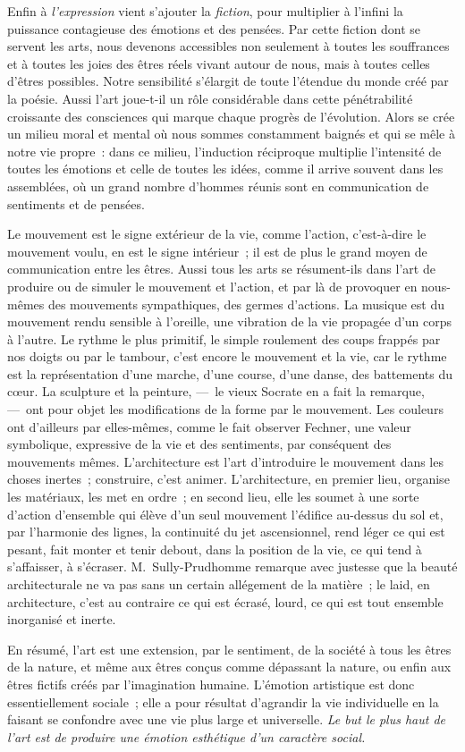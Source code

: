 \documentclass[french,twoside]{book} %
\newcommand\chapterclose{} %
\begin{document}
Enfin à \emph{l’expression} vient s’ajouter la \emph{fiction}, pour multiplier à l’infini la puissance contagieuse des émotions et des pensées. Par cette fiction dont se servent les arts, nous devenons accessibles non seulement à toutes les souffrances et à toutes les joies des êtres réels vivant autour de nous, mais à toutes celles d’êtres possibles. Notre sensibilité s’élargit de toute l’étendue du monde créé par la poésie. Aussi l’art joue-t-il un rôle considérable dans cette pénétrabilité croissante des consciences qui marque chaque progrès de l’évolution. Alors se crée un milieu moral et mental où nous sommes constamment baignés et qui se mêle à notre vie propre : dans ce milieu, l’induction réciproque multiplie l’intensité de toutes les émotions et celle de toutes les idées, comme il arrive souvent dans les assemblées, où un grand nombre d’hommes réunis sont en communication de sentiments et de pensées.\par
Le mouvement est le signe extérieur de la vie, comme l’action, c’est-à-dire le mouvement voulu, en est le signe intérieur ; il est de plus le grand moyen de communication entre les êtres. Aussi tous les arts se résument-ils dans l’art de produire ou de simuler le mouvement et l’action, et par là de provoquer en nous-mêmes des mouvements sympathiques, des germes d’actions. La musique est du mouvement rendu sensible à l’oreille, une vibration de la vie propagée d’un corps à l’autre. Le rythme le plus primitif, le simple roulement des coups frappés par nos doigts ou par le tambour, c’est encore le mouvement et la vie, car le rythme est la représentation d’une marche, d’une course, d’une danse, des battements du cœur. La sculpture et la peinture, — le vieux Socrate en a fait la remarque, — ont pour objet les modifications de la forme par le mouvement. Les couleurs ont d’ailleurs par elles-mêmes, comme le fait observer Fechner, une valeur symbolique, expressive de la vie et des sentiments, par conséquent des mouvements mêmes. L’architecture est l’art d’introduire le mouvement dans les choses inertes ; construire, c’est animer. L’architecture, en premier lieu, organise les matériaux, les met en ordre ; en second lieu, elle les soumet à une sorte d’action d’ensemble qui élève d’un seul mouvement l’édifice au-dessus du sol et, par l’harmonie des lignes, la continuité du jet ascensionnel, rend léger ce qui est pesant, fait monter et tenir debout, dans la position de la vie, ce qui tend à s’affaisser, à s’écraser. M. Sully-Prudhomme remarque avec justesse que la beauté architecturale ne va pas sans un certain allégement de la matière ; le laid, en architecture, c’est au contraire ce qui est écrasé, lourd, ce qui est tout ensemble inorganisé et inerte.\par
En résumé, l’art est une extension, par le sentiment, de la société à tous les êtres de la nature, et même aux êtres conçus comme dépassant la nature, ou enfin aux êtres fictifs créés par l’imagination humaine. L’émotion artistique est donc essentiellement sociale ; elle a pour résultat d’agrandir la vie individuelle en la faisant se confondre avec une vie plus large et universelle. \emph{Le but le plus haut de l’art est de produire une émotion esthétique d’un caractère social.}
\chapterclose
\end{document}
